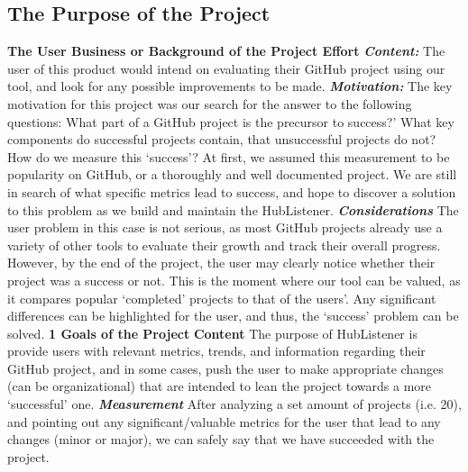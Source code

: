 \documentclass{article}
\begin{document}
\subsection{The Purpose of the Project}
\textbf{The User Business or Background of the Project Effort}
\newline
\textbf{\textit{Content:}} The user of this product would intend on evaluating their GitHub project using our tool, and look for any possible improvements to be made. \newline
\textbf{\textit{Motivation:}}\newline
The key motivation for this project was our search for the answer to the following questions: What part of a GitHub project is the precursor to success?' What key components do successful projects contain, that unsuccessful projects do not? How do we measure this ‘success’? At first, we assumed this measurement to be popularity on GitHub, or a thoroughly and well documented project. We are still in search of what specific metrics lead to success, and hope to discover a solution to this problem as we build and maintain the HubListener. \newline
\textbf{\textit{Considerations}}
The user problem in this case is not serious, as most GitHub projects already use a variety of other tools to evaluate their growth and track their overall progress. However, by the end of the project, the user may clearly notice whether their project was a success or not. This is the moment where our tool can be valued, as it compares popular ‘completed’ projects to that of the users’. Any significant differences can be highlighted for the user, and thus, the ‘success’ problem can be solved. \newline
\textbf{1 Goals of the Project}
\textbf{Content}\newline
The purpose of HubListener is provide users with relevant metrics, trends, and information regarding their GitHub project, and in some cases, push the user to make appropriate changes (can be organizational) that are intended to lean the project towards a more ‘successful’ one.\newline
\textbf{\textit{Measurement}}
After analyzing a set amount of projects (i.e. 20), and pointing out any significant/valuable metrics for the user that lead to any changes (minor or major), we can safely say that we have succeeded with the project.
\end{document}
